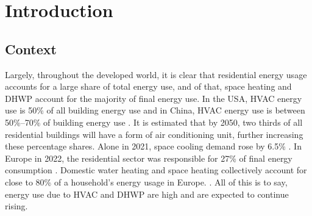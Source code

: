\chapter{Introduction}\label{ch:intro}



\section{Context}\label{sec:context}

Largely, throughout the developed world, it is clear that residential energy usage accounts for a large share of total energy use, and of that, space heating and \ac{DHWP} account for the majority of final energy use. In the USA, \ac{HVAC} energy use is 50\% of all building energy use and in China, \ac{HVAC} energy use is between 50\%--70\% of building energy use \cite{ieaorg_2018}. It is estimated that by 2050, two thirds of all residential buildings will have a form of air conditioning unit, further increasing these percentage shares. Alone in 2021, space cooling demand rose by 6.5\% \cite{ieaorg_2022}. 
In Europe in 2022, the  residential sector was responsible for 27\% of final energy consumption \cite{eurostat_final_2018}. Domestic water heating and space heating collectively account for close to 80\% of a household's energy usage in Europe. \cite{eurostat_energy_2020}.
All of this is to say, energy use due to \ac{HVAC} and \ac{DHWP} are high and are expected to continue rising. 

